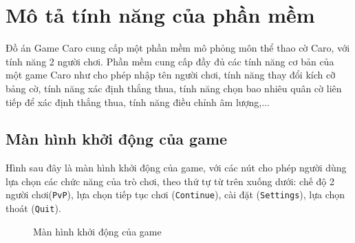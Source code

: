 \section{Mô tả tính năng của phần mềm}
Đồ án Game Caro cung cấp một phần mềm mô phỏng môn thể thao cờ Caro, với tính năng 2 người chơi. Phần mềm cung cấp đầy đủ các tính năng cơ bản của một game Caro như cho phép nhập tên người chơi, tính năng thay đổi kích cỡ bảng cờ, tính năng xác định thắng thua, tính năng chọn bao nhiêu quân cờ liên tiếp để xác định thắng thua, tính năng điều chỉnh âm lượng,...

\subsection{Màn hình khởi động của game}
Hình sau đây là màn hình khởi động của game, với các nút cho phép người dùng lựa chọn các chức năng của trò chơi, theo thứ tự từ trên xuống dưới: chế độ 2 người chơi(\verb|PvP|), lựa chọn tiếp tục chơi (\verb|Continue|), cài đặt (\verb|Settings|), lựa chọn thoát (\verb|Quit|).

\begin{figure}[H]
\caption{Màn hình khởi động của game}
\end{figure}
